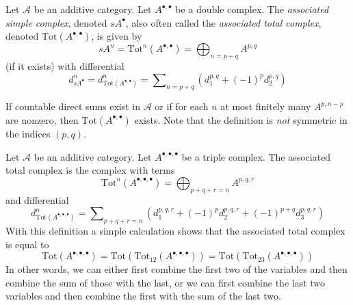 \begin{definition}
\label{definition-associated-simple-complex}
Let $\mathcal{A}$ be an additive category.
Let $A^{\bullet, \bullet}$ be a double complex.
The {\it associated simple complex}, denoted $sA^\bullet$, also
often called the {\it associated total complex}, denoted
$\text{Tot}(A^{\bullet, \bullet})$, is
given by
$$
sA^n = \text{Tot}^n(A^{\bullet, \bullet}) =
\bigoplus\nolimits_{n = p + q} A^{p, q}
$$
(if it exists) with differential
$$
d_{sA^\bullet}^n = d_{\text{Tot}(A^{\bullet, \bullet})}^n =
\sum\nolimits_{n = p + q} (d_1^{p, q} + (-1)^p d_2^{p, q})
$$
\end{definition}

\noindent
If countable direct sums exist in $\mathcal{A}$ or if for each $n$ at most
finitely many $A^{p, n - p}$ are nonzero, then
$\text{Tot}(A^{\bullet, \bullet})$ exists. Note that
the definition is {\it not} symmetric in the indices $(p, q)$.

\begin{remark}
\label{remark-triple-complex}
Let $\mathcal{A}$ be an additive category. Let $A^{\bullet, \bullet, \bullet}$
be a triple complex. The associated total complex is the complex with
terms
$$
\text{Tot}^n(A^{\bullet, \bullet, \bullet}) =
\bigoplus\nolimits_{p + q + r = n} A^{p, q, r}
$$
and differential
$$
d^n_{\text{Tot}(A^{\bullet, \bullet, \bullet})} =
\sum\nolimits_{p + q + r = n}\left(
d_1^{p, q, r} + (-1)^pd_2^{p, q, r} + (-1)^{p + q}d_3^{p, q, r}\right)
$$
With this definition a simple calculation shows that the associated total
complex is equal to
$$
\text{Tot}(A^{\bullet, \bullet, \bullet}) =
\text{Tot}(\text{Tot}_{12}(A^{\bullet, \bullet, \bullet})) =
\text{Tot}(\text{Tot}_{23}(A^{\bullet, \bullet, \bullet}))
$$
In other words, we can either first combine the first two of the variables
and then combine the sum of those with the last, or we can first combine the
last two variables and then combine the first with the sum of the last two.
\end{remark}

